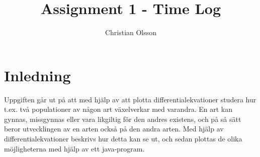 \documentclass[fleqn,a4paper,11pt]{article}
\title{Assignment 1 - Time Log}
\author{Christian Olsson}
\begin{document}
\maketitle                      %

\thispagestyle{empty}           %

\newpage                        %

\section{Inledning}
Uppgiften går ut på att med hjälp av att plotta differentialekvationer studera hur t.ex. två populationer av någon art växelverkar med varandra. En art kan gynnas, missgynnas eller vara likgiltig för den andres existens, och på så sätt beror utvecklingen av en arten också på den andra arten. Med hjälp av differentialekvationer beskrivs hur detta kan se ut, och sedan plottas de olika möjligheterna med hjälp av ett java-program.
\end{document}
